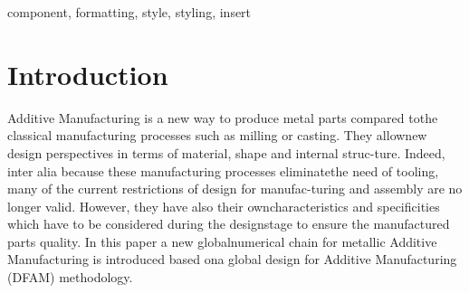\documentclass[conference]{IEEEtran}
\begin{document}
\begin{IEEEkeywords}
	component, formatting, style, styling, insert
\end{IEEEkeywords}

\section{Introduction}
Additive Manufacturing is a new way to produce metal parts compared tothe classical manufacturing processes such as milling or casting. They allownew design perspectives in terms of material, shape and internal struc-ture. Indeed, inter alia because these manufacturing processes eliminatethe need of tooling, many of the current restrictions of design for manufac-turing and assembly are no longer valid. However, they have also their owncharacteristics and specificities which have to be considered during the designstage to ensure the manufactured parts quality. In this paper a new globalnumerical chain for metallic Additive Manufacturing is introduced based ona global design for Additive Manufacturing (DFAM) methodology.
\end{document}

